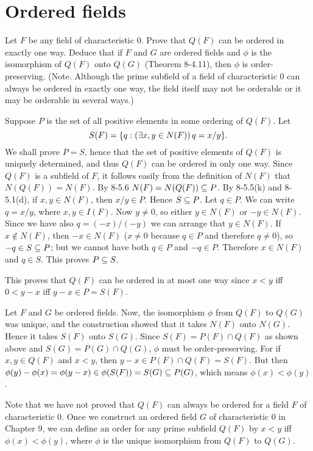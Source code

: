 \section{Ordered fields}
\begin{exercise}
Let $F$ be any field of characteristic $0$. Prove that $Q(F)$ can be ordered in exactly
one way. Deduce that if $F$ and $G$ are ordered fields and $\phi$ is the isomorphism of $Q(F)$
onto $Q(G)$ (Theorem 8-4.11), then $\phi$ is order-preserving. (Note. Although the prime
subfield of a field of characteristic $0$ can always be ordered in exactly one way, the field
itself may not be orderable or it may be orderable in several ways.)
\end{exercise}

\begin{solution}
Suppose $P$ is the set of all positive elements in some ordering of $Q(F)$. Let
\[S(F) = \setb{q}{(\exists x, y\in N(F))\thinspace q = x/y}.\]
We shall prove $P = S$, hence that the set of positive
elements of $Q(F)$ is uniquely determined, and thus $Q(F)$ can be ordered in only one way.
Since $Q(F)$ is a subfield of $F$, it follows easily from the definition of $N(F)$ that $N(Q(F)) =
N(F)$. By 8-5.6 $N(F) = N(Q(F)) \subseteq P$. By 8-5.5(k) and 8-5.1(d), if $x,y \in N(F)$,
then $x/y \in P$. Hence $S\subseteq P$. Let $q\in P$. We can write $q = x/y$, where $x, y\in I(F)$.
Now $y\neq 0$, so either $y \in N(F)$ or $-y\in N(F)$. Since we have also $q = (-x)/(-y)$
we can arrange that $y\in N(F)$. If $x \nin N(F)$, then $-x\in N(F)$ ($x\neq 0$ because $q\in P$
and therefore $q\neq 0$), so $-q \in S \subseteq P$; but we cannot have both $q\in P$ and $-q\in P$.
Therefore $x\in N(F)$ and $q\in S$. This proves $P\subseteq S$.

This proves that $Q(F)$ can be ordered in at most one way since $x < y$ iff $0<y-x$ iff $y-x\in P=S(F)$.

Let $F$ and $G$ be ordered fields.
Now, the isomorphism $\phi$ from $Q(F)$ to $Q(G)$ was unique, and the construction showed
that it takes $N(F)$ onto $N(G)$. Hence it takes $S(F)$ onto $S(G)$. Since $S(F) = P(F)\cap Q(F)$
as shown above and $S(G)= P(G) \cap Q(G)$, $\phi$ must be order-preserving. For if $x,y\in Q(F)$
and $x<y$, then $y-x\in P(F)\cap Q(F)=S(F)$. But then
$\phi(y)-\phi(x)=\phi(y-x)\in \phi(S(F))=S(G)\subseteq P(G)$, which means $\phi(x)<\phi(y)$.

Note that we have not proved that $Q(F)$ can always be ordered for a field $F$ of characteristic 0.
Once we construct an ordered field $G$ of characteristic 0 in Chapter 9,
we can define an order for any prime subfield $Q(F)$ by $x<y$ iff $\phi(x)<\phi(y)$, where $\phi$ is the
unique isomorphism from $Q(F)$ to $Q(G)$.
\end{solution}

